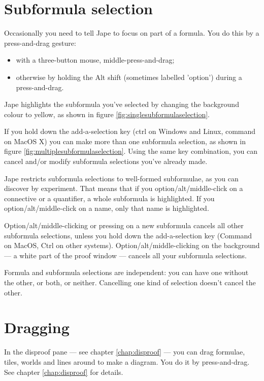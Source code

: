 \documentclass[11pt]{book}
\newcommand{\figref}[1]{figure \ref{fig:#1}}
\newcommand{\chapref}[1]{chapter \ref{chap:#1}}
\begin{document}
\section{Subformula selection}
\label{sec:subformulaselection}

Occasionally you need to tell Jape to focus on part of a formula. You do this by a press-and-drag gesture:
\begin{itemize}
\item with a three-button mouse, middle-press-and-drag;
\item otherwise by holding the Alt shift (sometimes labelled 'option') during a press-and-drag.
\end{itemize}

Jape highlights the subformula you've selected by changing the background colour to yellow, as shown in \figref{singlesubformulaselection}. 

If you hold down the add-a-selection key (ctrl on Windows and Linux, command on MacOS X) you can make more than one subformula selection, as shown in \figref{multiplesubformulaselection}. Using the same key combination, you can cancel and/or modify subformula selections you've already made.

Jape restricts subformula selections to well-formed subformulae, as you can discover by experiment. That means that if you option/alt/middle-click on a connective or a quantifier, a whole subformula is highlighted. If you option/alt/middle-click on a name, only that name is highlighted.

Option/alt/middle-clicking or pressing on a new subformula cancels all other subformula selections, unless you hold down the add-a-selection key (Command on MacOS, Ctrl on other systems). Option/alt/middle-clicking on the background --- a white part of the proof window --- cancels all your subformula selections.

Formula and subformula selections are independent: you can have one without the other, or both, or neither. Cancelling one kind of selection doesn't cancel the other. 

\section{Dragging}

In the disproof pane --- see \chapref{disproof} --- you can drag formulae, tiles, worlds and lines around to make a diagram. You do it by press-and-drag. See \chapref{disproof} for details.
\end{document}
